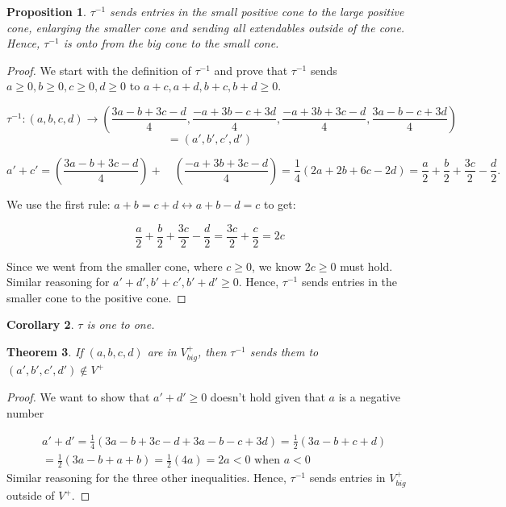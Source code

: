 \documentclass[11pt]{amsart}
\newtheorem{thm}{Theorem}[section]
\newtheorem{prop}[thm]{Proposition}
\newtheorem{cor}[thm]{Corollary}
\theoremstyle{definition}
\begin{document}
\begin{prop}
    $\tau^{-1}$ sends entries in the small positive cone to the large positive cone, enlarging the smaller cone and sending all extendables outside of the cone. Hence, $\tau^{-1}$ is onto from the big cone to the small cone.
\end{prop}

\begin{proof}
    We start with the definition of $\tau^{-1}$ and prove that $\tau^{-1}$ sends $a \geq 0, b \geq 0, c \geq 0, d \geq 0$ to $a + c, a + d, b + c, b + d \geq 0$.

\[
\tau^{-1}: (a,b,c,d) \to \left( \frac{3a - b + 3c - d}{4}, \frac{-a + 3b - c + 3d}{4}, \frac{-a + 3b + 3c - d}{4}, \frac{3a - b - c + 3d}{4} \right)
\]
\[
= (a', b', c', d')
\]

\[
a' + c' = \left( \frac{3a - b + 3c - d}{4} \right) + \quad \left( \frac{-a + 3b + 3c - d}{4} \right) = \frac{1}{4} \left( 2a + 2b + 6c - 2d \right) = \frac{a}{2} + \frac{b}{2} + \frac{3c}{2} - \frac{d}{2}.
\]

We use the first rule: $a + b = c+ d \leftrightarrow a + b - d = c$ to get:

\[
\frac{a}{2} + \frac{b}{2} + \frac{3c}{2} - \frac{d}{2} = \frac{3c}{2} + \frac{c}{2} = 2c
\]

Since we went from the smaller cone, where $c \geq 0$, we know $2c \geq 0$ must hold. Similar reasoning for $a' + d', b' + c', b' + d' \geq 0$. Hence, $\tau^{-1}$ sends entries in the smaller cone to the positive cone.
\end{proof}

\begin{cor}
    $\tau$ is one to one.
\end{cor}

\begin{thm}
    If $(a,b,c,d)$ are in $V^+_{big}$, then $\tau^{-1}$ sends them to $(a',b',c',d') \notin V^+$
\end{thm}

\begin{proof}

We want to show that \( a' + d' \geq 0 \) doesn't hold given that $a$ is a negative number

\begin{align*}
    & a' + d' = \frac{1}{4} \left( 3a - b + 3c - d + 3a - b - c + 3d \right) = \frac{1}{2} \left( 3a - b + c + d \right) \\
    & = \frac{1}{2} \left( 3a - b + a + b \right) = \frac{1}{2} \left( 4a \right) = 2a < 0 \text{ when } a < 0
\end{align*} Similar reasoning for the three other inequalities. Hence, $\tau^{-1}$ sends entries in $V^+_{big}$ outside of $V^+$.

\end{proof}
\end{document}
